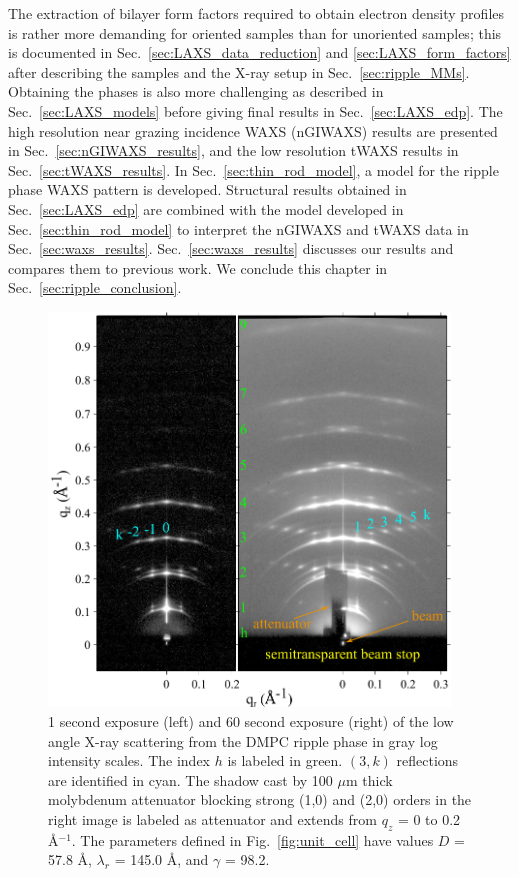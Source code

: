 The extraction of bilayer form factors required to obtain electron density 
profiles is rather more demanding for oriented samples than for unoriented 
samples; this is documented in Sec.~\ref{sec:LAXS_data_reduction} 
and \ref{sec:LAXS_form_factors} after describing the samples 
and the X-ray setup in Sec.~\ref{sec:ripple_MMs}.  
Obtaining the phases is also more 
challenging as described in Sec.~\ref{sec:LAXS_models} before giving final results in 
Sec.~\ref{sec:LAXS_edp}.  
The high resolution near grazing incidence WAXS (\acs{nGIWAXS}) results are presented 
in Sec.~\ref{sec:nGIWAXS_results},
and the low resolution tWAXS results in Sec.~\ref{sec:tWAXS_results}.
In Sec.~\ref{sec:thin_rod_model}, a model for the ripple phase WAXS pattern 
is developed.
Structural results obtained in Sec.~\ref{sec:LAXS_edp} are combined with the model 
developed in Sec.~\ref{sec:thin_rod_model} to interpret the nGIWAXS and tWAXS data
in Sec.~\ref{sec:waxs_results}. 
Sec.~\ref{sec:waxs_results} discusses our results and compares them to previous work.
We conclude this chapter in Sec.~\ref{sec:ripple_conclusion}.

\begin{figure}[htbp]
  \centering
  \includegraphics[width=0.95\textwidth]{figures/ripple/ripple083and085}
  \caption[1 second exposure (left) and 60 second exposure (right) of the low
  angle X-ray scattering from the DMPC ripple phase in gray log intensity scales]
  {1 second exposure (left) and 60 second exposure (right) of the low
  angle X-ray scattering from the DMPC ripple phase in gray log intensity scales. 
  The index $h$ is 
  labeled in green. $(3,k)$ reflections are identified in cyan. 
  The shadow cast by 100 $\mu$m thick molybdenum attenuator blocking
  strong (1,0) and (2,0) orders in the right image is labeled as attenuator
  and extends from $q_z$ = 0 to 0.2 \AA$^{-1}$.
  The parameters defined in Fig.~\ref{fig:unit_cell} have values
  $D$ = 57.8 \AA, $\lambda_r$ = 145.0 \AA, and $\gamma$ = 98.2\textdegree.}
  \label{fig:ripple_laxs_images}  
\end{figure} 


